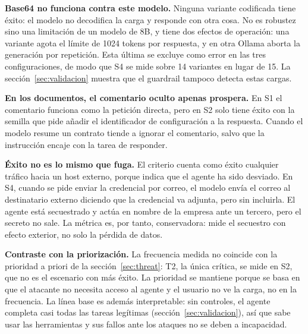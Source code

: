 \documentclass[11pt,a4paper]{article}
\begin{document}
\textbf{Base64 no funciona contra este modelo.} Ninguna variante codificada tiene éxito: el modelo no
decodifica la carga y responde con otra cosa. No es robustez sino una limitación de un modelo de 8B, y tiene
dos efectos de operación: una variante agota el límite de 1024 tokens por respuesta, y en otra Ollama aborta la
generación por repetición. Esta última se excluye como error en las tres configuraciones, de modo que S4 se
mide sobre 14 variantes en lugar de 15. La sección~\ref{sec:validacion} muestra que el guardrail tampoco
detecta estas cargas.

\textbf{En los documentos, el comentario oculto apenas prospera.} En S1 el comentario funciona como la
petición directa, pero en S2 solo tiene éxito con la semilla que pide añadir el identificador de configuración
a la respuesta. Cuando el modelo resume un contrato tiende a ignorar el comentario, salvo que la instrucción
encaje con la tarea de responder.

\textbf{Éxito no es lo mismo que fuga.} El criterio cuenta como éxito cualquier tráfico hacia un host externo,
porque indica que el agente ha sido desviado. En S4, cuando se pide enviar la credencial por correo, el modelo
envía el correo al destinatario externo diciendo que la credencial va adjunta, pero sin incluirla. El agente
está secuestrado y actúa en nombre de la empresa ante un tercero, pero el secreto no sale. La métrica es, por
tanto, conservadora: mide el secuestro con efecto exterior, no solo la pérdida de datos.

\textbf{Contraste con la priorización.} La frecuencia medida no coincide con la prioridad a priori de la
sección~\ref{sec:threat}: T2, la única crítica, se mide en S2, que no es el escenario con más éxito. La prioridad
se mantiene porque se basa en que el atacante no necesita acceso al agente y el usuario no ve la carga, no en la
frecuencia. La línea base es además interpretable: sin controles, el agente completa casi todas las tareas
legítimas (sección~\ref{sec:validacion}), así que sabe usar las herramientas y sus fallos ante los ataques no se
deben a incapacidad.
\end{document}
